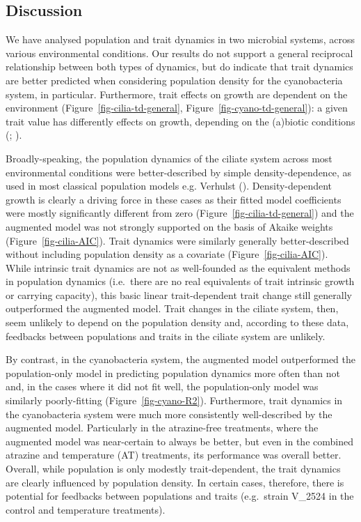 \documentclass[
  letterpaper,
  DIV=11,
  numbers=noendperiod]{scrartcl}
\begin{document}
\subsection{Discussion}\label{sec-DAE_discussion}

We have analysed population and trait dynamics in two microbial systems,
across various environmental conditions. Our results do not support a
general reciprocal relationship between both types of dynamics, but do
indicate that trait dynamics are better predicted when considering
population density for the cyanobacteria system, in particular.
Furthermore, trait effects on growth are dependent on the environment
(Figure~\ref{fig-cilia-td-general}, Figure~\ref{fig-cyano-td-general}):
a given trait value has differently effects on growth, depending on the
(a)biotic conditions (;
).

Broadly-speaking, the population dynamics of the ciliate system across
most environmental conditions were better-described by simple
density-dependence, as used in most classical population models e.g.
Verhulst (). Density-dependent growth
is clearly a driving force in these cases as their fitted model
coefficients were mostly significantly different from zero
(Figure~\ref{fig-cilia-td-general}) and the augmented model was not
strongly supported on the basis of Akaike weights
(Figure~\ref{fig-cilia-AIC}). Trait dynamics were similarly generally
better-described without including population density as a covariate
(Figure~\ref{fig-cilia-AIC}). While intrinsic trait dynamics are not as
well-founded as the equivalent methods in population dynamics
(i.e.~there are no real equivalents of trait intrinsic growth or
carrying capacity), this basic linear trait-dependent trait change still
generally outperformed the augmented model. Trait changes in the ciliate
system, then, seem unlikely to depend on the population density and,
according to these data, feedbacks between populations and traits in the
ciliate system are unlikely.

By contrast, in the cyanobacteria system, the augmented model
outperformed the population-only model in predicting population dynamics
more often than not and, in the cases where it did not fit well, the
population-only model was similarly poorly-fitting
(Figure~\ref{fig-cyano-R2}). Furthermore, trait dynamics in the
cyanobacteria system were much more consistently well-described by the
augmented model. Particularly in the atrazine-free treatments, where the
augmented model was near-certain to always be better, but even in the
combined atrazine and temperature (AT) treatments, its performance was
overall better. Overall, while population is only modestly
trait-dependent, the trait dynamics are clearly influenced by population
density. In certain cases, therefore, there is potential for feedbacks
between populations and traits (e.g.~strain V\_2524 in the control and
temperature treatments).
\end{document}
